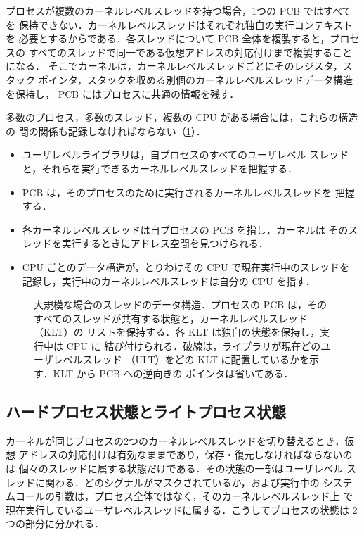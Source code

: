 \documentclass[../main.tex]{subfiles}
\begin{document}
プロセスが複数のカーネルレベルスレッドを持つ場合，1つの PCB ではすべてを
保持できない．カーネルレベルスレッドはそれぞれ独自の実行コンテキストを
必要とするからである．各スレッドについて PCB 全体を複製すると，プロセスの
すべてのスレッドで同一である仮想アドレスの対応付けまで複製することになる．
そこでカーネルは，カーネルレベルスレッドごとにそのレジスタ，スタック
ポインタ，スタックを収める別個のカーネルレベルスレッドデータ構造を保持し，
PCB にはプロセスに共通の情報を残す．

多数のプロセス，多数のスレッド，複数の CPU がある場合には，これらの構造の
間の関係も記録しなければならない（\cref{fig:l05-structures}）．
\begin{itemize}
  \item ユーザレベルライブラリは，自プロセスのすべてのユーザレベル
    スレッドと，それらを実行できるカーネルレベルスレッドを把握する．
  \item PCB は，そのプロセスのために実行されるカーネルレベルスレッドを
    把握する．
  \item 各カーネルレベルスレッドは自プロセスの PCB を指し，カーネルは
    そのスレッドを実行するときにアドレス空間を見つけられる．
  \item CPU ごとのデータ構造が，とりわけその CPU で現在実行中のスレッドを
    記録し，実行中のカーネルレベルスレッドは自分の CPU を指す．
\end{itemize}

\begin{figure}[htbp]
  \centering
  
  \caption{大規模な場合のスレッドのデータ構造．プロセスの PCB は，その
    すべてのスレッドが共有する状態と，カーネルレベルスレッド（KLT）の
    リストを保持する．各 KLT は独自の状態を保持し，実行中は CPU に
    結び付けられる．破線は，ライブラリが現在どのユーザレベルスレッド
    （ULT）をどの KLT に配置しているかを示す．KLT から PCB への逆向きの
    ポインタは省いてある．}
  \label{fig:l05-structures}
\end{figure}

\subsection{ハードプロセス状態とライトプロセス状態}

カーネルが同じプロセスの2つのカーネルレベルスレッドを切り替えるとき，仮想
アドレスの対応付けは有効なままであり，保存・復元しなければならないのは
個々のスレッドに属する状態だけである．その状態の一部はユーザレベル
スレッドに関わる．どのシグナルがマスクされているか，および実行中の
システムコールの引数は，プロセス全体ではなく，そのカーネルレベルスレッド上
で現在実行しているユーザレベルスレッドに属する．こうしてプロセスの状態は
2つの部分に分かれる．
\end{document}
